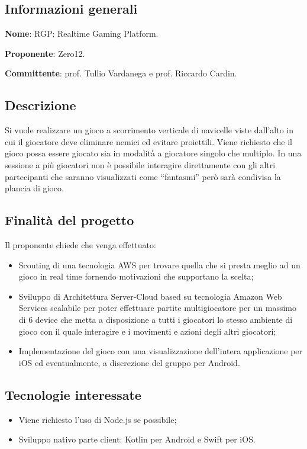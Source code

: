 \documentclass[../studio-di-fattibilita.tex]{subfiles}
\begin{document}
\subsection{Informazioni generali}%
\label{sub:informazioni_generale}
\begin{description}
  \item \textbf{Nome}: RGP: Realtime Gaming Platform.
  \item \textbf{Proponente}: Zero12.
  \item \textbf{Committente}: prof. Tullio Vardanega e prof. Riccardo Cardin.
\end{description}

\subsection{Descrizione}%
\label{sub:descrizione}
Si vuole realizzare un gioco a scorrimento verticale di navicelle viste dall’alto in cui il giocatore deve eliminare nemici ed evitare proiettili. Viene richiesto che il gioco possa essere giocato sia in modalità a giocatore singolo che multiplo. In una sessione a più giocatori non è possibile interagire direttamente con gli altri partecipanti che saranno visualizzati come “fantasmi” però sarà condivisa la plancia di gioco.

\subsection{Finalità del progetto}%
\label{sub:finalita_del_progetto}
Il proponente chiede che venga effettuato:
\begin{itemize}
  \item Scouting di una tecnologia AWS per trovare quella che si presta meglio ad un gioco in real time fornendo motivazioni che supportano la scelta;
  \item Sviluppo di Architettura  Server-Cloud based su tecnologia Amazon Web Services scalabile per poter effettuare partite multigiocatore per un massimo di 6 device che metta a disposizione a tutti i giocatori lo stesso ambiente di gioco con il quale interagire e i movimenti e azioni degli altri giocatori;
  \item Implementazione del gioco con una visualizzazione dell’intera applicazione per iOS ed eventualmente, a discrezione del gruppo per Android.
\end{itemize}


\subsection{Tecnologie interessate}%
\label{sub:tecnologie_interessate}
\begin{itemize}
  \item Viene richiesto l’uso di Node.js se possibile;
  \item Sviluppo nativo parte client: Kotlin per Android e Swift per iOS.
\end{itemize}
\end{document}
